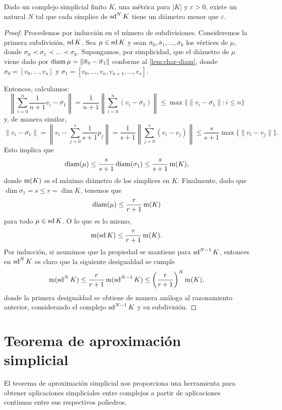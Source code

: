 \begin{teorema}
	\label{teo:cota-medida-complejo}
	Dado un complejo simplicial finito $K$, una métrica para $|K|$ y $\varepsilon > 0$, existe un natural $N$ tal que cada símplice de $\operatorname{sd}^N K$ tiene un diámetro menor que $\varepsilon$.
\end{teorema}
\begin{proof}
	Procedemos por inducción en el número de subdivisiones. Consideremos la primera subdivisión, $\operatorname{sd} K$. Sea $\mu \in \operatorname{sd} K$ y sean $\overline{\sigma}_0, \overline{\sigma}_1, \ldots, \overline{\sigma}_k$ los vértices de $\mu$, donde $\sigma_0 \prec \sigma_1 \prec \ldots \prec \sigma_k$. Supongamos, por simplicidad, que el diámetro de $\mu$ viene dado por $\operatorname{diam} \mu = \|\overline{\sigma}_0 - \overline{\sigma}_1\|$ conforme al \autoref{lem:char-diam}, donde $\sigma_0 = [v_0, \ldots, v_n]$ y $\sigma_1 = [v_0, \ldots, v_n, v_{n+1}, \ldots, v_s]$.

	Entonces, calculamos:
	\[
		\left\|\sum_{i=0}^{n}\frac{1}{n+1}v_{i}-\overline{\sigma_{1}}\right\| = \frac{1}{n+1}\left\|\sum_{i=0}^{n}(v_{i}-\overline{\sigma_{1}})\right\| \leq \max\{\|v_{i}-\overline{\sigma_{1}}\| : i\leq n\}
	\]
	y, de manera similar,
	\[
		\|v_{i}-\overline{\sigma_{1}}\| = \left\|v_{i}-\sum_{j=0}^{s}\frac{1}{s+1}p_{j}\right\| = \frac{1}{s+1}\left\|\sum_{j=0}^{s}(v_{i}-v_{j})\right\| \leq \frac{s}{s+1}\max\{\|v_{i}-v_{j}\|\}.
	\]
	Esto implica que
	\[
		\operatorname{diam}(\mu) \leq \frac{s}{s+1}\operatorname{diam}(\sigma_{1}) \leq \frac{s}{s+1} \operatorname{m} (K),
	\]
	donde $\operatorname{m}(K)$ es el máximo diámetro de los símplices en $K$. Finalmente, dado que $\dim \sigma_1 = s \leq r = \dim K$, tenemos que
	\[
		\operatorname{diam}(\mu) \leq \frac{r}{r+1}\operatorname{m}(K)
	\]
	para todo $\mu \in \operatorname{sd} K$. O lo que es lo mismo, 
	\[
		\operatorname{m}(\operatorname{sd} K) \leq \frac{r}{r+1}\operatorname{m}(K).
	\]
	Por inducción, si asumimos que la propiedad se mantiene para $\operatorname{sd}^{N-1}K$, entonces en $\operatorname{sd}^N K$ es claro que la siguiente desigualdad se cumple
	\[
		\operatorname{m}(\operatorname{sd}^N K) \leq \frac{r}{r+1} \operatorname{m} (\operatorname{sd}^{N-1} K) \leq \left( \frac{r}{r+1} \right)^{N} \operatorname{m}(K),
	\]
	donde la primera desigualdad se obtiene de manera análoga al razonamiento anterior, considerando el complejo $\operatorname{sd}^{N-1} K$ y su subdivisión.
\end{proof}

\section{Teorema de aproximación simplicial}

El teorema de aproximación simplicial nos proporciona una herramienta para obtener aplicaciones simpliciales entre complejos a partir de aplicaciones continuas entre sus respectivos poliedros.

